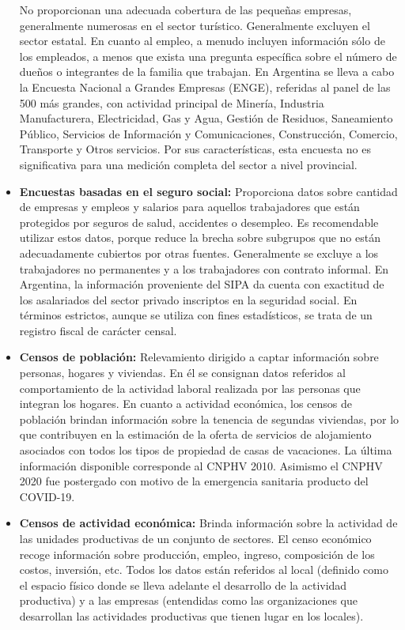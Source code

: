 \documentclass[
  openany]{book}
\begin{document}
\begin{itemize}
  No proporcionan una adecuada cobertura de las pequeñas empresas, generalmente numerosas en el sector turístico.
  Generalmente excluyen el sector estatal.
  En cuanto al empleo, a menudo incluyen información sólo de los empleados, a menos que exista una pregunta específica sobre el número de dueños o integrantes de la familia que trabajan.
  En Argentina se lleva a cabo la Encuesta Nacional a Grandes Empresas (ENGE), referidas al panel de las 500 más grandes, con actividad principal de Minería, Industria Manufacturera, Electricidad, Gas y Agua, Gestión de Residuos, Saneamiento Público, Servicios de Información y Comunicaciones, Construcción, Comercio, Transporte y Otros servicios.
  Por sus características, esta encuesta no es significativa para una medición completa del sector a nivel provincial.
\item
  \textbf{Encuestas basadas en el seguro social:} Proporciona datos sobre cantidad de empresas y empleos y salarios para aquellos trabajadores que están protegidos por seguros de salud, accidentes o desempleo.
  Es recomendable utilizar estos datos, porque reduce la brecha sobre subgrupos que no están adecuadamente cubiertos por otras fuentes.
  Generalmente se excluye a los trabajadores no permanentes y a los trabajadores con contrato informal.
  En Argentina, la información proveniente del SIPA da cuenta con exactitud de los asalariados del sector privado inscriptos en la seguridad social.
  En términos estrictos, aunque se utiliza con fines estadísticos, se trata de un registro fiscal de carácter censal.
\item
  \textbf{Censos de población:} Relevamiento dirigido a captar información sobre personas, hogares y viviendas.
  En él se consignan datos referidos al comportamiento de la actividad laboral realizada por las personas que integran los hogares.
  En cuanto a actividad económica, los censos de población brindan información sobre la tenencia de segundas viviendas, por lo que contribuyen en la estimación de la oferta de servicios de alojamiento asociados con todos los tipos de propiedad de casas de vacaciones.
  La última información disponible corresponde al CNPHV 2010.
  Asimismo el CNPHV 2020 fue postergado con motivo de la emergencia sanitaria producto del COVID-19.
\item
  \textbf{Censos de actividad económica:} Brinda información sobre la actividad de las unidades productivas de un conjunto de sectores.
  El censo económico recoge información sobre producción, empleo, ingreso, composición de los costos, inversión, etc.
  Todos los datos están referidos al local (definido como el espacio físico donde se lleva adelante el desarrollo de la actividad productiva) y a las empresas (entendidas como las organizaciones que desarrollan las actividades productivas que tienen lugar en los locales).

\end{itemize}
\end{document}
